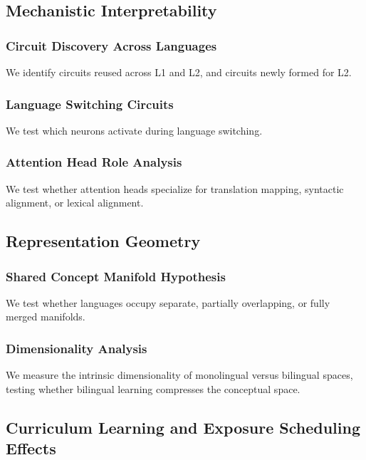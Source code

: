 \subsection{Mechanistic Interpretability}

\subsubsection{Circuit Discovery Across Languages}

We identify circuits reused across L1 and L2, and circuits newly formed for L2.

\subsubsection{Language Switching Circuits}

We test which neurons activate during language switching.

\subsubsection{Attention Head Role Analysis}

We test whether attention heads specialize for translation mapping, syntactic alignment, or lexical alignment.

\subsection{Representation Geometry}

\subsubsection{Shared Concept Manifold Hypothesis}

We test whether languages occupy separate, partially overlapping, or fully merged manifolds.

\subsubsection{Dimensionality Analysis}

We measure the intrinsic dimensionality of monolingual versus bilingual spaces, testing whether bilingual learning compresses the conceptual space.

\subsection{Curriculum Learning and Exposure Scheduling Effects}

